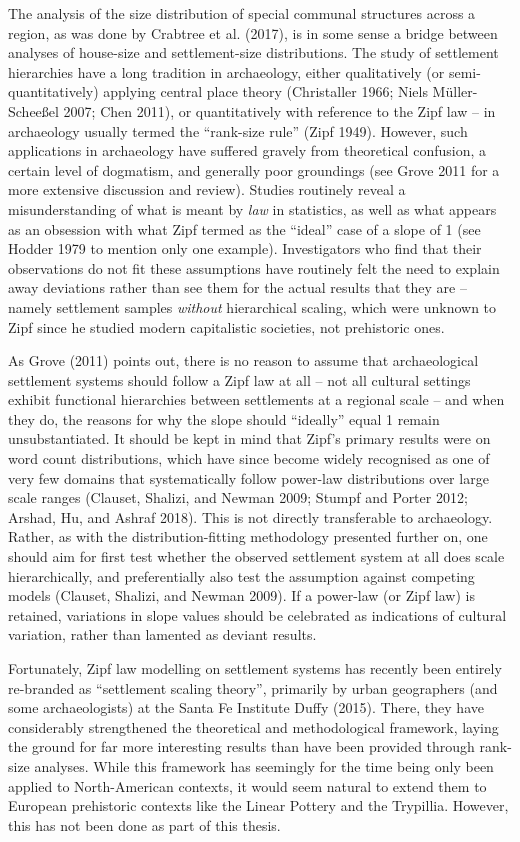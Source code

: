 \documentclass[
  12pt,
  a4paper, twoside]{book}
\begin{document}
The analysis of the size distribution of special communal structures across a region, as was done by Crabtree et al. (2017), is in some sense a bridge between analyses of house-size and settlement-size distributions. The study of settlement hierarchies have a long tradition in archaeology, either qualitatively (or semi-quantitatively) applying central place theory (Christaller 1966; Niels Müller-Scheeßel 2007; Chen 2011), or quantitatively with reference to the Zipf law -- in archaeology usually termed the ``rank-size rule'' (Zipf 1949). However, such applications in archaeology have suffered gravely from theoretical confusion, a certain level of dogmatism, and generally poor groundings (see Grove 2011 for a more extensive discussion and review). Studies routinely reveal a misunderstanding of what is meant by \emph{law} in statistics, as well as what appears as an obsession with what Zipf termed as the ``ideal'' case of a slope of 1 (see Hodder 1979 to mention only one example). Investigators who find that their observations do not fit these assumptions have routinely felt the need to explain away deviations rather than see them for the actual results that they are -- namely settlement samples \emph{without} hierarchical scaling, which were unknown to Zipf since he studied modern capitalistic societies, not prehistoric ones.

As Grove (2011) points out, there is no reason to assume that archaeological settlement systems should follow a Zipf law at all -- not all cultural settings exhibit functional hierarchies between settlements at a regional scale -- and when they do, the reasons for why the slope should ``ideally'' equal 1 remain unsubstantiated. It should be kept in mind that Zipf's primary results were on word count distributions, which have since become widely recognised as one of very few domains that systematically follow power-law distributions over large scale ranges (Clauset, Shalizi, and Newman 2009; Stumpf and Porter 2012; Arshad, Hu, and Ashraf 2018). This is not directly transferable to archaeology. Rather, as with the distribution-fitting methodology presented further on, one should aim for first test whether the observed settlement system at all does scale hierarchically, and preferentially also test the assumption against competing models (Clauset, Shalizi, and Newman 2009). If a power-law (or Zipf law) is retained, variations in slope values should be celebrated as indications of cultural variation, rather than lamented as deviant results.

Fortunately, Zipf law modelling on settlement systems has recently been entirely re-branded as ``settlement scaling theory'', primarily by urban geographers (and some archaeologists) at the Santa Fe Institute Duffy (2015). There, they have considerably strengthened the theoretical and methodological framework, laying the ground for far more interesting results than have been provided through rank-size analyses. While this framework has seemingly for the time being only been applied to North-American contexts, it would seem natural to extend them to European prehistoric contexts like the Linear Pottery and the Trypillia. However, this has not been done as part of this thesis.
\end{document}

